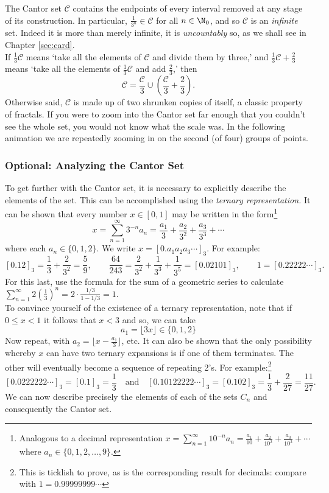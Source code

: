 \quad The Cantor set $\mathcal{C}$ contains the endpoints of every interval removed at any stage of its construction. In particular, $\frac 1{3^n}\in\mathcal C$ for all $n\in\N_0$, and so $\mathcal C$ is an \emph{infinite} set. Indeed it is more than merely infinite, it is \emph{uncountably} so, as we shall see in Chapter \ref{sec:card}.\\

\quad If $\frac 13\mathcal C$ means `take all the elements of $\mathcal C$ and divide them by three,' and $\frac 13\mathcal C+\frac 23$ means `take all the elements of $\frac 13\mathcal C$ and add $\frac 23$,' then
\[\mathcal C=\frac{\mathcal C}{3}\cup\left(\frac{\mathcal C}{3}+\frac 23\right).\tag*{($\ast$)}\]
Otherwise said, $\mathcal C$ is made up of two shrunken copies of itself, a classic property of fractals. If you were to zoom into the Cantor set far enough that you couldn't see the whole set, you would not know what the scale was. In the following animation we are repeatedly zooming in on the second (of four) groups of points.
\begin{center} 
\end{center}

\subsubsection*{Optional: Analyzing the Cantor Set}

To get further with the Cantor set, it is necessary to explicitly describe the elements of the set. This can be accomplished using the \emph{ternary representation.}\label{page:cantor} It can be shown that every number $x\in[0,1]$ may be written in the form\footnote{Analogous to a decimal representation $x=\sum\limits_{n=1}^\infty 10^{-n}a_n=\frac{a_1}{10}+\frac{a_2}{10^2}+\frac{a_3}{10^3}+\cdots$ where $a_n\in\{0,1,2,\ldots,9\}$.}
  \[x=\sum\limits_{n=1}^\infty 3^{-n}a_n=\frac{a_1}{3}+\frac{a_2}{3^2}+\frac{a_3}{3^3}+\cdots\]
  where each $a_n\in\{0,1,2\}$. We write $x=[0.a_1a_2a_3\cdots]_3$. For example:
\[[0.12]_3=\frac 13+\frac 2{3^2}=\frac 59,\qquad \frac{64}{243}=\frac 2{3^2}+\frac 1{3^3}+\frac 1{3^5}=[0.02101]_3,\qquad 1=[0.22222\cdots]_3.\]
For this last, use the formula for the sum of a geometric series to calculate $\sum\limits_{n=1}^\infty 2\left(\frac 13\right)^n=2\cdot\frac{1/3}{1-1/3}=1$.\\
To convince yourself of the existence of a ternary representation, note that if $0\le x<1$ it follows that $x<3$ and so, we can take
\[a_1=\lfloor 3x\rfloor\in\{0,1,2\}\]
Now repeat, with $a_2=\lfloor x-\frac{a_1}3\rfloor$, etc.
  It can also be shown that the only possibility whereby $x$ can have two ternary expansions is if one of them terminates. The other will eventually become a sequence of repeating 2's. For example:\footnote{This is ticklish to prove, as is the corresponding result for decimals: compare with $1=0.99999999\cdots$}
  \[[0.0222222\cdots]_3=[0.1]_3=\frac 13\quad \text{and}\quad [0.10122222\cdots]_3=[0.102]_3=\frac 13+\frac 2{27}=\frac{11}{27}.\]
  We can now describe precisely the elements of each of the sets $C_n$ and consequently the Cantor set.


